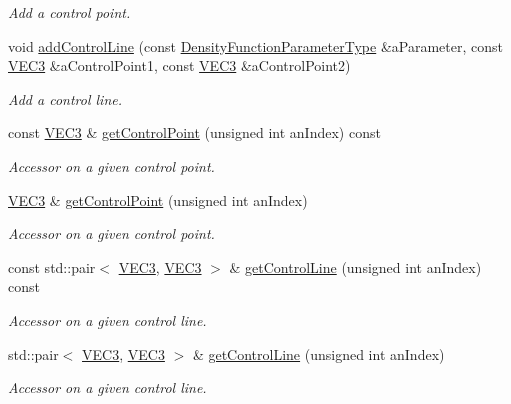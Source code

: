\begin{DoxyCompactItemize}
\begin{DoxyCompactList}\small\item\em Add a control point. \end{DoxyCompactList}\item 
void \hyperlink{class_graphics_1_1_implicit_surface_a579465d911df032eb90aa4ad7d0eadd4}{addControlLine} (const \hyperlink{class_graphics_1_1_implicit_surface_1_1_density_function_parameter_type}{DensityFunctionParameterType} \&aParameter, const \hyperlink{class_math_1_1_vec3}{VEC3} \&aControlPoint1, const \hyperlink{class_math_1_1_vec3}{VEC3} \&aControlPoint2)
\begin{DoxyCompactList}\small\item\em Add a control line. \end{DoxyCompactList}\item 
const \hyperlink{class_math_1_1_vec3}{VEC3} \& \hyperlink{class_graphics_1_1_implicit_surface_a1428e25a99cf4244faf75292e97f739e}{getControlPoint} (unsigned int anIndex) const 
\begin{DoxyCompactList}\small\item\em Accessor on a given control point. \end{DoxyCompactList}\item 
\hyperlink{class_math_1_1_vec3}{VEC3} \& \hyperlink{class_graphics_1_1_implicit_surface_ae65cca8c425ec37d12d923adb1d68718}{getControlPoint} (unsigned int anIndex)
\begin{DoxyCompactList}\small\item\em Accessor on a given control point. \end{DoxyCompactList}\item 
const std::pair$<$ \hyperlink{class_math_1_1_vec3}{VEC3}, \hyperlink{class_math_1_1_vec3}{VEC3} $>$ \& \hyperlink{class_graphics_1_1_implicit_surface_a54a198f579826d1d7c5288216f33be7d}{getControlLine} (unsigned int anIndex) const 
\begin{DoxyCompactList}\small\item\em Accessor on a given control line. \end{DoxyCompactList}\item 
std::pair$<$ \hyperlink{class_math_1_1_vec3}{VEC3}, \hyperlink{class_math_1_1_vec3}{VEC3} $>$ \& \hyperlink{class_graphics_1_1_implicit_surface_ab86e34059614ed0a0d1f40fa41145a35}{getControlLine} (unsigned int anIndex)
\begin{DoxyCompactList}\small\item\em Accessor on a given control line. \end{DoxyCompactList}\item 

\end{DoxyCompactItemize}
